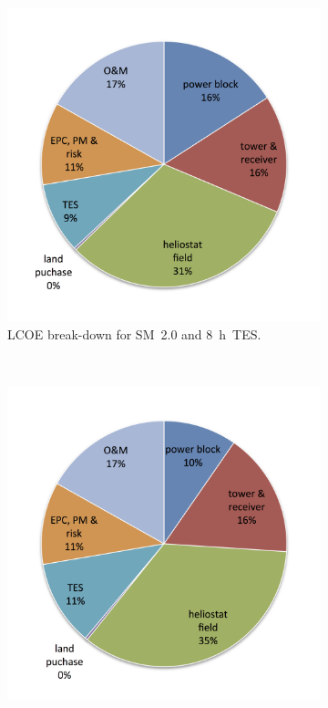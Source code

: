 \begin{figure}[!htbp]
        \centering                
        \begin{subfigure}[b]{0.5\textwidth}
                \centering
                \includegraphics[width=1\textwidth]{FIG/CR_LCOE_lowinvest_BreakDown}
                \caption{LCOE break-down for SM~2.0 and \SI{8}{h}~TES.}\label{CR_LCOE_lowinvest_BreakDown}
        \end{subfigure}%
        ~
        \begin{subfigure}[b]{0.5\textwidth}
                \centering
                \includegraphics[width=1\textwidth]{FIG/CR_LCOE_highinvest_BreakDown}

\end{subfigure}
\end{figure}
